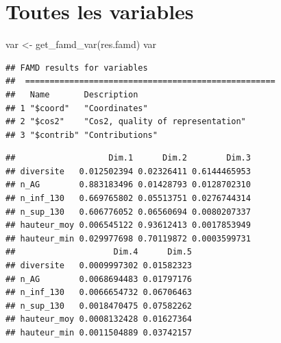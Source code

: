 \documentclass[
  12pt,
  american,
  a4paper,
  extrafontsizes,onecolumn,openright
  ]{memoir}
\newenvironment{Shaded}{\begin{snugshade}}{\end{snugshade}}
\newcommand{\CommentTok}[1]{\textcolor[rgb]{0.56,0.35,0.01}{\textit{#1}}}
\newcommand{\FunctionTok}[1]{\textcolor[rgb]{0.00,0.00,0.00}{#1}}
\newcommand{\NormalTok}[1]{#1}
\newcommand{\OtherTok}[1]{\textcolor[rgb]{0.56,0.35,0.01}{#1}}
\newcommand{\SpecialCharTok}[1]{\textcolor[rgb]{0.00,0.00,0.00}{#1}}
\begin{document}
\normalsize

\hypertarget{toutes-les-variables}{%
\section{Toutes les variables}\label{toutes-les-variables}}

\scriptsize

\begin{Shaded}
\begin{Highlighting}[]
\NormalTok{var }\OtherTok{\textless{}{-}} \FunctionTok{get\_famd\_var}\NormalTok{(res.famd)}
\NormalTok{var}
\end{Highlighting}
\end{Shaded}

\begin{verbatim}
## FAMD results for variables 
##  ===================================================
##   Name       Description                      
## 1 "$coord"   "Coordinates"                    
## 2 "$cos2"    "Cos2, quality of representation"
## 3 "$contrib" "Contributions"
\end{verbatim}

\begin{Shaded}
\end{Shaded}

\begin{verbatim}
##                   Dim.1      Dim.2        Dim.3
## diversite   0.012502394 0.02326411 0.6144465953
## n_AG        0.883183496 0.01428793 0.0128702310
## n_inf_130   0.669765802 0.05513751 0.0276744314
## n_sup_130   0.606776052 0.06560694 0.0080207337
## hauteur_moy 0.006545122 0.93612413 0.0017853949
## hauteur_min 0.029977698 0.70119872 0.0003599731
##                    Dim.4      Dim.5
## diversite   0.0009997302 0.01582323
## n_AG        0.0068694483 0.01797176
## n_inf_130   0.0066654732 0.06706463
## n_sup_130   0.0018470475 0.07582262
## hauteur_moy 0.0008132428 0.01627364
## hauteur_min 0.0011504889 0.03742157
\end{verbatim}

\begin{Shaded}
\end{Shaded}
\end{document}
